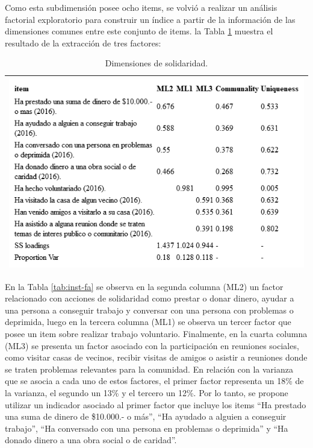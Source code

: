 \documentclass[
  12pt,
]{book}
\begin{document}
Como esta subdimensión posee ocho items, se volvió a realizar un análisis factorial exploratorio para construir un índice a partir de la información de las dimensiones comunes entre este conjunto de items. la Tabla \ref{tab:solidaridad-fa} muestra el resultado de la extracción de tres factores:

\begin{longtable}[]{@{}l@{}}
\caption{\label{tab:solidaridad-fa}Dimensiones de solidaridad.}\tabularnewline
\toprule
\endhead
\includegraphics[width=6.77083in,height=\textheight]{output/tables/solidaridad_fa.png}\tabularnewline
\bottomrule
\end{longtable}

En la Tabla \ref{tab:inst-fa} se observa en la segunda columna (ML2) un factor relacionado con acciones de solidaridad como prestar o donar dinero, ayudar a una persona a conseguir trabajo y conversar con una persona con problemas o deprimida, luego en la tercera columna (ML1) se observa un tercer factor que posee un item sobre realizar trabajo voluntario. Finalmente, en la cuarta columna (ML3) se presenta un factor asociado con la participación en reuniones sociales, como visitar casas de vecinos, recibir visitas de amigos o asistir a reuniones donde se traten problemas relevantes para la comunidad. En relación con la varianza que se asocia a cada uno de estos factores, el primer factor representa un 18\% de la varianza, el segundo un 13\% y el tercero un 12\%. Por lo tanto, se propone utilizar un indicador asociado al primer factor que incluye los items ``Ha prestado una suma de dinero de \$10.000.- o más'', ``Ha ayudado a alguien a conseguir trabajo'', ``Ha conversado con una persona en problemas o deprimida'' y ``Ha donado dinero a una obra social o de caridad''.
\end{document}
